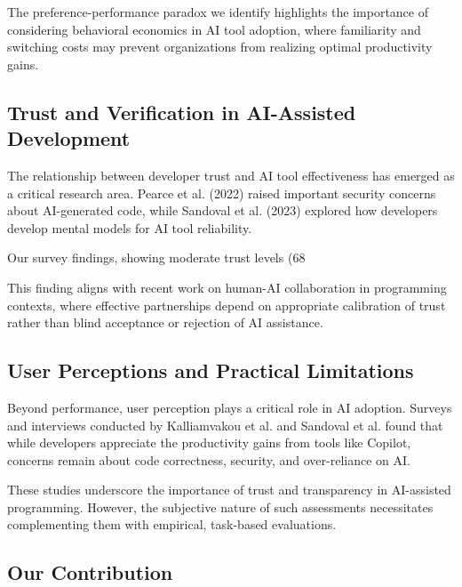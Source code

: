 \documentclass[conference]{IEEEtran}
\begin{document}
The preference-performance paradox we identify highlights the importance of considering behavioral economics in AI tool adoption, where familiarity and switching costs may prevent organizations from realizing optimal productivity gains.

\subsection{Trust and Verification in AI-Assisted Development}

The relationship between developer trust and AI tool effectiveness has emerged as a critical research area. Pearce et al. (2022) raised important security concerns about AI-generated code, while Sandoval et al. (2023) explored how developers develop mental models for AI tool reliability.

Our survey findings, showing moderate trust levels (68%

This finding aligns with recent work on human-AI collaboration in programming contexts, where effective partnerships depend on appropriate calibration of trust rather than blind acceptance or rejection of AI assistance.

\subsection{User Perceptions and Practical Limitations}

Beyond performance, user perception plays a critical role in AI adoption. Surveys and interviews conducted by Kalliamvakou et al. and Sandoval et al. found that while developers appreciate the productivity gains from tools like Copilot, concerns remain about code correctness, security, and over-reliance on AI.

These studies underscore the importance of trust and transparency in AI-assisted programming. However, the subjective nature of such assessments necessitates complementing them with empirical, task-based evaluations.



\subsection{Our Contribution}
\end{document}
